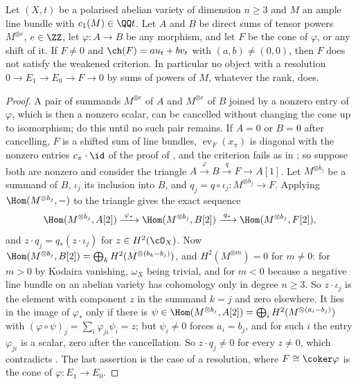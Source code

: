 \begin{theorem}\label{thm:nosplit}
Let $(X,t)$ be a polarised abelian variety of dimension $n\ge3$ and $M$ an
ample line bundle with $c_{1}(M)\in\QQ t$. Let $A$ and $B$ be direct sums of
tensor powers $M^{\otimes e}$, $e\in\ZZ$, let $\varphi\colon A\to B$ be any
morphism, and let $F$ be the cone of $\varphi$, or any shift of it. If $F\ne0$
and $\ch(F)=au_{t}+bv_{t}$ with $(a,b)\ne(0,0)$, then $F$ does not satisfy
the weakened criterion. In particular no object with a resolution
$0\to E_{1}\to E_{0}\to F\to0$ by sums of powers of $M$, whatever the rank,
does.
\end{theorem}

\begin{proof}
A pair of summands $M^{\otimes e}$ of $A$ and $M^{\otimes e}$ of $B$ joined
by a nonzero entry of $\varphi$, which is then a nonzero scalar, can be
cancelled without changing the cone up to isomorphism; do this until no such
pair remains. If $A=0$ or $B=0$ after cancelling, $F$ is a shifted sum of
line bundles, $\operatorname{ev}_{F}(x_{\pi})$ is diagonal with the nonzero
entries $c_{\pi}\cdot\id$ of the proof of , and the
criterion fails as in ; so suppose both are nonzero and
consider the triangle $A\xrightarrow{\varphi}B\xrightarrow{\;q\;}F\to A[1]$.
Let $M^{\otimes b_{j}}$ be a summand of $B$, $\iota_{j}$ its inclusion into
$B$, and $q_{j}=q\circ\iota_{j}\colon M^{\otimes b_{j}}\to F$. Applying
$\Hom(M^{\otimes b_{j}},-)$ to the triangle gives the exact sequence
\[
  \Hom(M^{\otimes b_{j}},A[2])\xrightarrow{\;\varphi_{*}\;}
  \Hom(M^{\otimes b_{j}},B[2])\xrightarrow{\;q_{*}\;}
  \Hom(M^{\otimes b_{j}},F[2]),
\]
and $z\cdot q_{j}=q_{*}(z\cdot\iota_{j})$ for $z\in H^{2}(\cO_{X})$. Now
$\Hom(M^{\otimes b_{j}},B[2])=\bigoplus_{k}H^{2}(M^{\otimes(b_{k}-b_{j})})$,
and $H^{2}(M^{\otimes m})=0$ for $m\ne0$: for $m>0$ by Kodaira vanishing,
$\omega_{X}$ being trivial, and for $m<0$ because a negative line bundle on
an abelian variety has cohomology only in degree $n\ge3$. So $z\cdot\iota_{j}$
is the element with component $z$ in the summand $k=j$ and zero elsewhere. It
lies in the image of $\varphi_{*}$ only if there is
$\psi\in\Hom(M^{\otimes b_{j}},A[2])=\bigoplus_{i}H^{2}(M^{\otimes(a_{i}-b_{j})})$
with $(\varphi\circ\psi)_{j}=\sum_{i}\varphi_{ji}\psi_{i}=z$; but $\psi_{i}\ne0$
forces $a_{i}=b_{j}$, and for such $i$ the entry $\varphi_{ji}$ is a scalar,
zero after the cancellation. So $z\cdot q_{j}\ne0$ for every $z\ne0$, which
contradicts . The last assertion is the case of a
resolution, where $F\cong\coker\varphi$ is the cone of $\varphi\colon E_{1}\to E_{0}$.
\end{proof}

